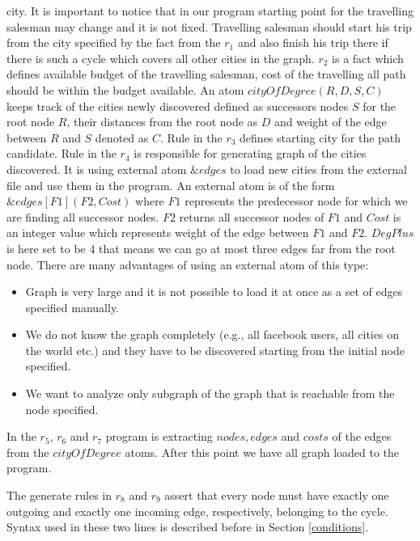 \documentclass[14pt,a4paper, titlepage]{article}
\newcommand{\ext}[3]{\ensuremath{\&{#1}[#2](#3)}}
\begin{document}
city. 
It is important to notice that in our program starting 
point for the travelling salesman may change and it is not 
fixed. Travelling salesman should start his trip from the 
city specified by the fact from the $r_1$ and also finish 
his trip there if there is such a cycle which covers all 
other cities in the graph. $r_2$ is a fact which defines 
available budget of the travelling salesman, cost of the 
travelling all path should be within the budget
available. An atom $\mathit{cityOfDegree(R,D,S,C)}$ keeps 
track of the cities newly discovered defined as successors 
nodes $S$ for the root node $R$, their distances from the 
root node as $D$ and weight of the edge between $R$ and $S$ 
denoted as $C$. Rule in the $r_3$ defines starting city for 
the path candidate. Rule in the $r_4$ is responsible for 
generating graph of 
the cities discovered. It is using external atom 
$\mathit{\&edges}$ to load new cities from the external 
file and use them in the program. An external atom is of 
the form $\ext{edges}{F1}{F2,Cost}$ where $\mathit{F1}$ 
represents the predecessor node for which we are finding 
all successor 
nodes. $\mathit{F2}$ returns all successor nodes of 
$\mathit{F1}$ and $\mathit{Cost}$ is an integer value which 
represents weight of the edge between $\mathit{F1}$ and 
$\mathit{F2}$. $\mathit{DegPlus}$ is here set to be 4 that 
means we can go at most three edges far from the root node. 
There are many advantages of using an external atom of this
type:
\begin{itemize}
\item Graph is very large and it is not possible to load it 
at once as a set of edges specified manually.
\item We do not know the graph completely (e.g., all 
facebook users, all cities on the world etc.) and they have 
to be discovered starting from the initial node specified.
\item We want to analyze only subgraph of the graph that is 
reachable from the node specified.
\end{itemize}    
In the $r_5$, $r_6$ and $r_7$ program is extracting 
$\mathit{nodes}, \mathit{edges}$ and $\mathit{costs}$ of 
the edges from the $\mathit{cityOfDegree}$ atoms. After 
this point we have all graph loaded to the program. 

The generate rules in $r_8$ and $r_{9}$ assert that every 
node must have exactly one outgoing and exactly one 
incoming edge, respectively, belonging to the cycle. Syntax 
used in these two lines is described before in Section 
\ref{conditions}.
\end{document}
